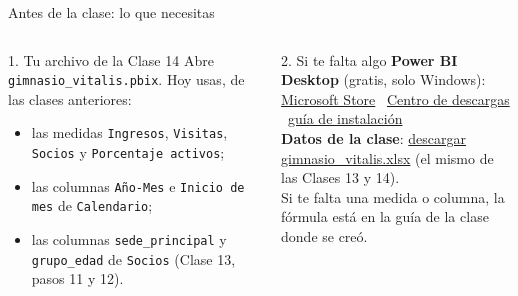 \documentclass[aspectratio=169,11pt]{beamer}
\newcommand{\urlinstalar}{https://learn.microsoft.com/es-es/power-bi/fundamentals/desktop-get-the-desktop}
\newcommand{\urlstore}{https://apps.microsoft.com/detail/9ntxr16hnw1t?hl=es-co}
\newcommand{\urlcentro}{https://www.microsoft.com/download/details.aspx?id=58494}
\newcommand{\urldatos}{https://github.com/craljimenez/An-lisis_y_Visualizacion_de_Datos_para_la_Toma_de_Decisiones/raw/main/clases/semana08-clase15-identificacion-insights-kpi-filtros/datos/gimnasio_vitalis.xlsx}
\begin{document}
\begin{frame}[t]{Antes de la clase: lo que necesitas}
  \begin{columns}[T,onlytextwidth]
    \begin{block}{1. Tu archivo de la Clase 14}
      \small Abre \texttt{gimnasio\_vitalis.pbix}. Hoy usas, de las clases
      anteriores:
      \begin{itemize}
        \footnotesize
        \item las medidas \texttt{Ingresos}, \texttt{Visitas},
          \texttt{Socios} y \texttt{Porcentaje activos};
        \item las columnas \texttt{Año-Mes} e \texttt{Inicio de mes} de
          \texttt{Calendario};
        \item las columnas \texttt{sede\_principal} y \texttt{grupo\_edad}
          de \texttt{Socios} (Clase 13, pasos 11 y 12).
      \end{itemize}
    \end{block}
    \begin{block}{2. Si te falta algo}
      \footnotesize
      \textbf{Power BI Desktop} (gratis, solo Windows):\\
      \href{\urlstore}{\color{esumerOrange}Microsoft Store} \textperiodcentered\
      \href{\urlcentro}{\color{esumerOrange}Centro de descargas} \textperiodcentered\
      \href{\urlinstalar}{\color{esumerOrange}guía de instalación}\\[4pt]
      \textbf{Datos de la clase}:
      \href{\urldatos}{\color{esumerOrange}descargar gimnasio\_vitalis.xlsx}
      (el mismo de las Clases 13 y 14).\\[4pt]
      Si te falta una medida o columna, la fórmula está en la guía de la
      clase donde se creó.
    \end{block}
  \end{columns}
\end{frame}
\end{document}
